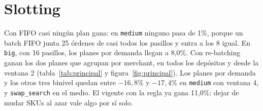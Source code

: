 \documentclass[11pt,a4paper,oneside]{report}
\newcommand{\code}[1]{\texttt{\small #1}}
\begin{document}
\section{Slotting}

Con FIFO casi ningún plan gana: en \code{medium} ninguno pasa de 1\%, porque un batch FIFO
junta 25 órdenes de casi todos los pasillos y entra a los 8 igual. En \code{big}, con 16
pasillos, los planes por demanda llegan a 8,0\%. Con re-batching ganan los dos planes que
agrupan por merchant, en todos los depósitos y desde la ventana 2 (tabla~\ref{tab:principal} y
figura~\ref{fig:principal}). Los planes por demanda y los otros tres binivel quedan entre
$-16{,}8\%$ y $-17{,}4\%$ en \code{medium} con ventana 4, y \code{swap\_search} en el medio. El
vigente con la regla ya gana 11,0\%: dejar de mudar SKUs al azar vale algo por sí solo.
\end{document}
